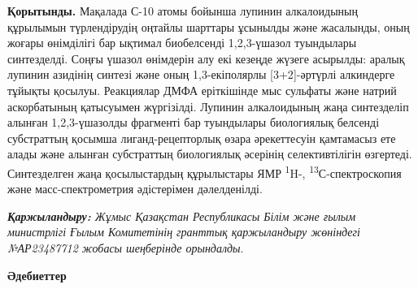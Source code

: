 \begin{multicols}{2}
{\bfseries Қорытынды.} Мақалада С-10 атомы бойынша лупинин алкалоидының
құрылымын түрлендірудің оңтайлы шарттары ұсынылды және жасалынды, оның
жоғары өнімділігі бар ықтимал биобелсенді 1,2,3-үшазол туындылары
синтезделді. Соңғы үшазол өнімдерін алу екі кезеңде жүзеге асырылды:
аралық лупинин азидінің синтезі және оның 1,3-екіполярлы
{[}3+2{]}-әртүрлі алкиндерге тұйықты қосылуы. Реакциялар ДМФА
еріткішінде мыс сульфаты және натрий аскорбатының қатысуымен жүргізілді.
Лупинин алкалоидының жаңа синтезделіп алынған 1,2,3-үшазолды фрагменті
бар туындылары биологиялық белсенді субстраттың қосымша
лиганд-рецепторлық өзара әрекеттесуін қамтамасыз ете алады және алынған
субстраттың биологиялық әсерінің селективтілігін өзгертеді. Синтезделген
жаңа қосылыстардың құрылыстары ЯМР \textsuperscript{1}H-,
\textsuperscript{13}С-спектроскопия және масс-спектрометрия әдістерімен
дәлелденілді.

\emph{{\bfseries Қаржыландыру:} Жұмыс Қазақстан Республикасы Білім және
ғылым министрлігі Ғылым Комитетінің гранттық қаржыландыру жөніндегі
№АР23487712 жобасы шеңберінде орындалды}.
\end{multicols}

\begin{center}
{\bfseries Әдебиеттер}
\end{center}


